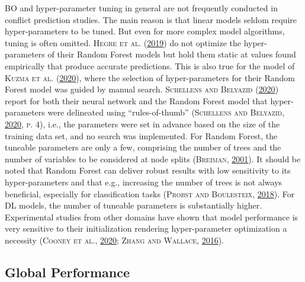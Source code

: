\documentclass[a4paper,11pt]{article}
\begin{document}
BO and hyper-parameter tuning in general are not frequently conducted in conflict prediction
studies. The main reason is that linear models seldom require hyper-parameters to
be tuned. But even for more complex model algorithms, tuning is often omitted.
\textsc{\textnormal{Hegre} \textnormal{et al.}} \textsc{(\textnormal{\protect\hyperlink{ref-hegre2019}{2019}})} do not optimize the hyper-parameters of their Random Forest models but
hold them static at values found empirically that produce accurate predictions.
This is also true for the model of \textsc{\textnormal{Kuzma} \textnormal{et al.}} \textsc{(\textnormal{\protect\hyperlink{ref-kuzma2020}{2020}})}, where the selection of hyper-parameters
for their Random Forest model was guided by manual search. \textsc{\textnormal{Schellens} and \textnormal{Belyazid}} \textsc{(\textnormal{\protect\hyperlink{ref-schellens2020}{2020}})} report
for both their neural network and the Random Forest model that hyper-parameters
were delineated using ``rules-of-thumb'' \textsc{(\textnormal{\textsc{Schellens} and \textsc{Belyazid}}, \textnormal{\protect\hyperlink{ref-schellens2020}{2020}}, \textnormal{\textsc{p.} \textsc{4}})}, i.e., the parameters
were set in advance based on the size of the training data set, and no search was
implemented. For Random Forest, the tuneable parameters are only a few,
comprising the number of trees and the number of variables to be considered
at node splits \textsc{(\textnormal{\textsc{Breiman}}, \textnormal{\protect\hyperlink{ref-breiman2001}{2001}})}. It should be noted that Random Forest can
deliver robust results with low sensitivity to its hyper-parameters and that
e.g., increasing the number of trees is not always beneficial, especially for
classification tasks \textsc{(\textnormal{\textsc{Probst} and \textsc{Boulesteix}}, \textnormal{\protect\hyperlink{ref-probst2018}{2018}})}. For DL models, the number of tuneable parameters
is substantially higher. Experimental studies from other domains have shown that
model performance is very sensitive to their initialization rendering hyper-parameter
optimization a necessity \textsc{(\textnormal{\textsc{Cooney} \textsc{et al.}}, \textnormal{\protect\hyperlink{ref-cooney2020}{2020}}; \textnormal{\textsc{Zhang} and \textsc{Wallace}}, \textnormal{\protect\hyperlink{ref-zhanga}{2016}})}.

\hypertarget{global-performance}{%
\subsection{Global Performance}\label{global-performance}}
\end{document}
